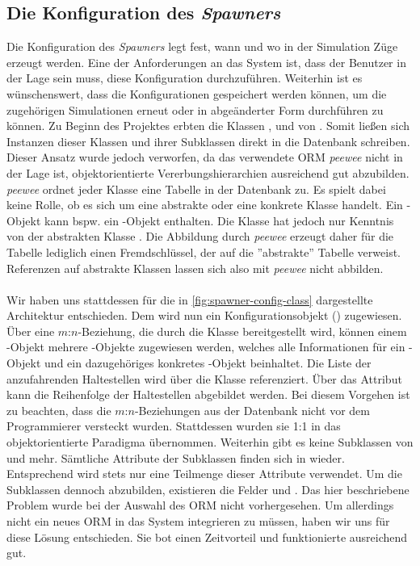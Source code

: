 \subsection{Die Konfiguration des \emph{Spawners}}

Die Konfiguration des \emph{Spawners} legt fest, wann und wo in der Simulation Züge erzeugt werden. Eine der Anforderungen an das System ist, dass der Benutzer in der Lage sein muss, diese Konfiguration durchzuführen. Weiterhin ist es wünschenswert, dass die Konfigurationen gespeichert werden können, um die zugehörigen Simulationen erneut oder in abgeänderter Form durchführen zu können. Zu Beginn des Projektes erbten die Klassen ,  und  von . Somit ließen sich Instanzen dieser Klassen und ihrer Subklassen direkt in die Datenbank schreiben. Dieser Ansatz wurde jedoch verworfen, da das verwendete ORM \emph{peewee} nicht in der Lage ist, objektorientierte Vererbungshierarchien ausreichend gut abzubilden. \emph{peewee} ordnet jeder Klasse eine Tabelle in der Datenbank zu. Es spielt dabei keine Rolle, ob es sich um eine abstrakte oder eine konkrete Klasse handelt. Ein -Objekt kann bspw. ein -Objekt enthalten. Die Klasse  hat jedoch nur Kenntnis von der abstrakten Klasse . Die Abbildung durch \emph{peewee} erzeugt daher für die Tabelle  lediglich einen Fremdschlüssel, der auf die ''abstrakte'' Tabelle  verweist. Referenzen auf abstrakte Klassen lassen sich also mit \emph{peewee} nicht abbilden.\\
\\
Wir haben uns stattdessen für die in \autoref{fig:spawner-config-class} dargestellte Architektur entschieden. Dem  wird nun ein Konfigurationsobjekt () zugewiesen. Über eine $m$:$n$-Beziehung, die durch die Klasse  bereitgestellt wird, können einem -Objekt mehrere -Objekte zugewiesen werden, welches alle Informationen für ein -Objekt und ein dazugehöriges konkretes -Objekt beinhaltet. Die Liste der anzufahrenden Haltestellen wird über die Klasse  referenziert. Über das Attribut  kann die Reihenfolge der Haltestellen abgebildet werden. Bei diesem Vorgehen ist zu beachten, dass die $m$:$n$-Beziehungen aus der Datenbank nicht vor dem Programmierer versteckt wurden. Stattdessen wurden sie 1:1 in das objektorientierte Paradigma übernommen. Weiterhin gibt es keine Subklassen von  und  mehr. Sämtliche Attribute der Subklassen finden sich in  wieder. Entsprechend wird stets nur eine Teilmenge dieser Attribute verwendet. Um die Subklassen dennoch abzubilden, existieren die Felder  und . Das hier beschriebene Problem wurde bei der Auswahl des ORM nicht vorhergesehen. Um allerdings nicht ein neues ORM in das System integrieren zu müssen, haben wir uns für diese Lösung entschieden. Sie bot einen Zeitvorteil und funktionierte ausreichend gut.

